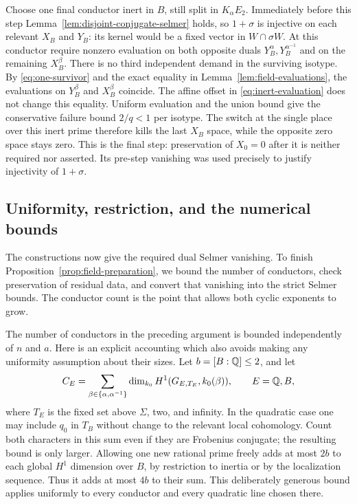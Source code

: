Choose one final conductor inert in $B$, still split in
$K_\alpha E_2$.  Immediately before this step
Lemma~\ref{lem:disjoint-conjugate-selmer} holds, so $1+\sigma$ is
injective on each relevant $X_B$ and $Y_B$: its kernel would be a
fixed vector in $W\cap\sigma W$.
At this conductor require nonzero evaluation on both opposite duals
$Y_B^\alpha,Y_B^{\alpha^{-1}}$ and on the remaining $X_B^\beta$.
There is no third independent demand in the surviving isotype.
By \eqref{eq:one-survivor} and the exact equality in
Lemma~\ref{lem:field-evaluations}, the evaluations on $Y_B^\beta$
and $X_B^\beta$ coincide.  The affine offset in
\eqref{eq:inert-evaluation} does not change this equality.
Uniform evaluation and the union bound give the conservative failure
bound $2/q<1$ per isotype.  The switch at the single place over this
inert prime therefore kills the last $X_B$ space, while the opposite
zero space stays zero.  This is the final step: preservation of
$X_0=0$ after it is neither required nor asserted.  Its pre-step
vanishing was used precisely to justify injectivity of $1+\sigma$.

\subsection{Uniformity, restriction, and the numerical bounds}

The constructions now give the required dual Selmer vanishing.
To finish Proposition~\ref{prop:field-preparation}, we bound the number
of conductors, check preservation of residual data, and convert that
vanishing into the strict Selmer bounds.  The conductor count is the
point that allows both cyclic exponents to grow.

The number of conductors in the preceding argument is bounded
independently of $n$ and $a$.  Here is an explicit accounting which
also avoids making any uniformity assumption about their sizes.
Let $b=[B:\mathbb Q]\le2$, and let
\[
 C_E=\sum_{\beta\in\{\alpha,\alpha^{-1}\}}
    \dim_{k_0}H^1(G_{E,T_E},k_0(\beta)),\qquad E=\mathbb Q,B,
\]
where $T_E$ is the fixed set above $\Sigma$, two, and infinity.
In the quadratic case one may include $q_0$ in $T_B$ without change
to the relevant local cohomology.  Count both characters in this
sum even if they are Frobenius conjugate; the resulting bound is
only larger.  Allowing one new rational prime freely adds at most
$2b$ to each global $H^1$ dimension over $B$, by restriction to
inertia or by the localization sequence.  Thus it adds at most
$4b$ to their sum.  This deliberately generous bound applies
uniformly to every conductor and every quadratic line chosen there.

